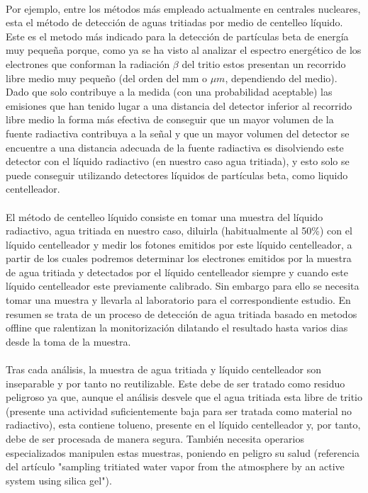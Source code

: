 \documentclass[11pt, a4paper]{article}
\begin{document}
\paragraph {}
Por ejemplo, entre los métodos más empleado actualmente en centrales nucleares, esta el método de detección de aguas tritiadas por medio de centelleo líquido. Este es el metodo más indicado para la detección de partículas beta de energía muy pequeña porque, como ya se ha visto al analizar el espectro energético de los electrones que conforman la radiación $\beta$ del tritio estos presentan un recorrido libre medio muy pequeño (del orden del mm o $\mu m$, dependiendo del medio). Dado que solo contribuye a la medida (con una probabilidad aceptable) las emisiones que han tenido lugar a una distancia del detector inferior al recorrido libre medio la forma más efectiva de conseguir que un mayor volumen de la fuente radiactiva contribuya a la señal y que un mayor volumen del detector se encuentre a una distancia adecuada de la fuente radiactiva es disolviendo este detector con el líquido radiactivo (en nuestro caso agua tritiada), y esto solo se puede conseguir utilizando detectores líquidos de partículas beta, como liquido centelleador. 

\paragraph {}
El método de centelleo líquido consiste en tomar una muestra del líquido radiactivo, agua tritiada en nuestro caso, diluirla (habitualmente al 50\%) con el líquido centelleador y medir los fotones emitidos por este líquido centelleador, a partir de los cuales podremos determinar los electrones emitidos por la muestra de agua tritiada y detectados por el líquido centelleador siempre y cuando este líquido centelleador este previamente calibrado. Sin embargo para ello se necesita tomar una muestra y llevarla al laboratorio para el correspondiente estudio. En resumen se trata de un proceso de detección de agua tritiada basado en metodos offline que ralentizan la monitorización dilatando el resultado hasta varios dias desde la toma de la muestra. 

\paragraph {}
Tras cada análisis, la muestra de agua tritiada y líquido centelleador son inseparable y por tanto no reutilizable.  Este debe de ser tratado como residuo peligroso ya que, aunque el análisis desvele que el agua tritiada esta libre de tritio (presente una actividad suficientemente baja para ser tratada como material no radiactivo), esta contiene tolueno, presente en el líquido centelleador y, por tanto, debe de ser procesada de manera segura. También necesita operarios especializados manipulen estas muestras, poniendo en peligro su salud (referencia del artículo "sampling tritiated water vapor from the atmosphere by an active system using silica gel").
\end{document}
